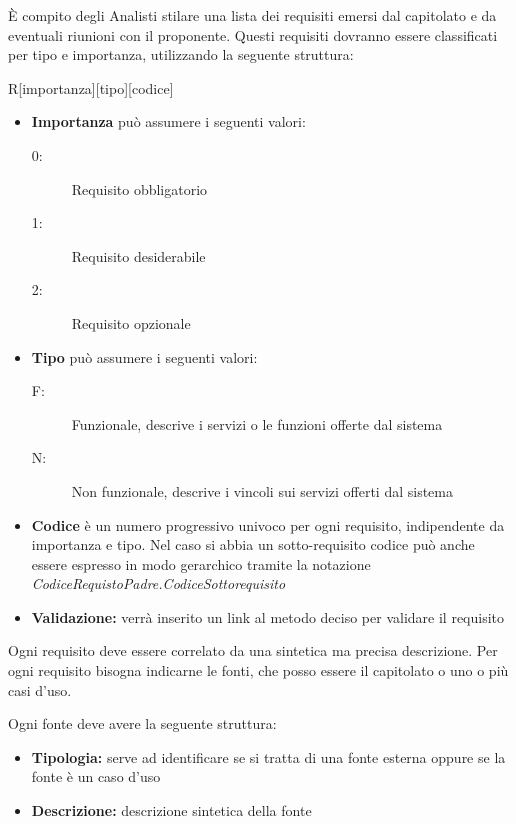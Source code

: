 \documentclass[12pt,a4paper]{article}
\begin{document}
È compito degli Analisti stilare una lista dei requisiti emersi dal capitolato e da eventuali riunioni con il proponente. Questi requisiti dovranno essere classificati per tipo e importanza, utilizzando la seguente struttura:
\begin{center}
	R[importanza][tipo][codice]
\end{center}
\begin{itemize}
	\item \textbf{Importanza} può assumere i seguenti valori:
	\begin{description}
		\item[0:] Requisito obbligatorio
		\item[1:] Requisito desiderabile
		\item[2:] Requisito opzionale
	\end{description}
	\item \textbf{Tipo} può assumere i seguenti valori:
	\begin{description}
		\item[F:] Funzionale, descrive i servizi o le funzioni offerte dal sistema
		\item[N:] Non funzionale, descrive i vincoli sui servizi offerti dal sistema
	\end{description}
	\item \textbf{Codice} è un numero progressivo univoco per ogni requisito, indipendente da importanza e tipo. Nel caso si abbia un sotto-requisito codice può anche essere espresso in modo gerarchico tramite la notazione \textit{CodiceRequistoPadre.CodiceSottorequisito}
	\item \textbf{Validazione:}	verrà inserito un link al metodo deciso per validare il requisito
\end{itemize}
Ogni requisito deve essere correlato da una sintetica ma precisa descrizione. Per ogni requisito bisogna indicarne le fonti, che posso essere il capitolato o uno o più casi d'uso.

Ogni fonte deve avere la seguente struttura:
\begin{itemize}
	\item \textbf{Tipologia:} serve ad identificare se si tratta di una fonte esterna oppure se la fonte è un caso d'uso
	\item \textbf{Descrizione:} descrizione sintetica della fonte
\end{itemize}
\end{document}
